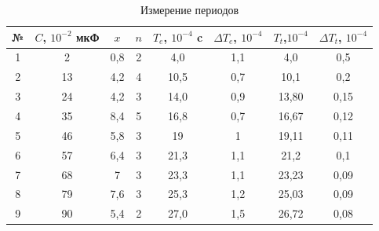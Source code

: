 \documentclass[a4paper,12pt]{article}
\begin{document}
\begin{table}[h!!!]
	\centering
	\caption{ Измерение периодов }
	
	\begin{tabular}{|c|c|c|c|c|c|c|c|}
		\hline 
		№ & $C$, $ 10^{-2} $ мкФ & $x$ & $n$ & $T_e$, $10^{-4}$ c & $\Delta T_e$, $10^{-4}$ & $T_t$,$10^{-4}$&  $\Delta T_t$, $10^{-4}$\\ 
		\hline 
		1 & 2 & 0,8 & 2 & 4,0 & 1,1 & 4,0 & 0,5\\ 
		\hline 
		2 & 13 & 4,2 & 4 & 10,5 & 0,7 & 10,1 & 0,2\\ 
		\hline 
		3 & 24 & 4,2 & 3 & 14,0 & 0,9 & 13,80 & 0,15 \\ 
		\hline 
		4 & 35 & 8,4 & 5 & 16,8 & 0,7 & 16,67 & 0,12\\ 
		\hline 
		5 & 46 & 5,8 & 3 & 19 & 1 & 19,11 & 0,11 \\ 
		\hline 
		6 & 57 & 6,4 & 3 & 21,3 & 1,1 & 21,2 & 0,1 \\ 
		\hline 
		7 & 68 & 7 & 3 & 23,3 & 1,1 & 23,23 & 0,09\\ 
		\hline 
		8 & 79 & 7,6 & 3 & 25,3 & 1,2 & 25,03 & 0,09\\ 
		\hline 
		9 & 90 & 5,4 & 2 & 27,0 & 1,5 & 26,72 & 0,08\\ 
		\hline 
	\end{tabular} 
	
\end{table}
\end{document}
